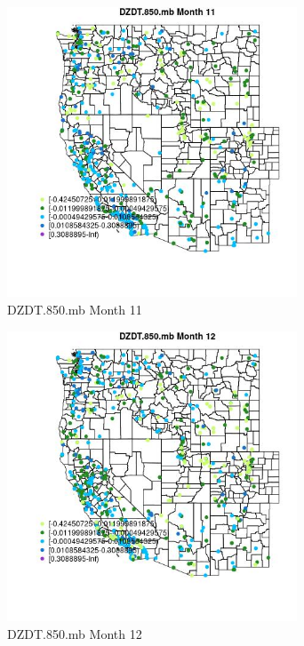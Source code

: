 \begin{figure} 
\centering  
\includegraphics[width=0.77\textwidth]{Code_Outputs/Report_ML_input_PM25_Step4_part_e_de_duplicated_aves_compiled_2019-05-14wNAs_MapObsMo11DZDT850mb.jpg} 
\caption{\label{fig:Report_ML_input_PM25_Step4_part_e_de_duplicated_aves_compiled_2019-05-14wNAsMapObsMo11DZDT850mb}DZDT.850.mb Month 11} 
\end{figure} 
 

\begin{figure} 
\centering  
\includegraphics[width=0.77\textwidth]{Code_Outputs/Report_ML_input_PM25_Step4_part_e_de_duplicated_aves_compiled_2019-05-14wNAs_MapObsMo12DZDT850mb.jpg} 
\caption{\label{fig:Report_ML_input_PM25_Step4_part_e_de_duplicated_aves_compiled_2019-05-14wNAsMapObsMo12DZDT850mb}DZDT.850.mb Month 12} 
\end{figure} 
 

